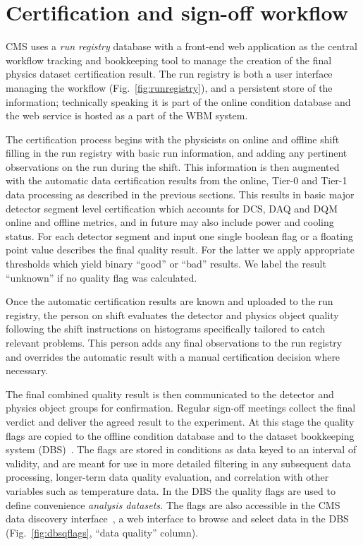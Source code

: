 \documentclass[a4paper]{jpconf}
\begin{document}
\section{Certification and sign-off workflow}\label{certification}

CMS uses a {\em run registry} database with a front-end web application as the
central workflow tracking and bookkeeping tool to manage the creation of the
final physics dataset certification result.  The run registry is both a user
interface managing the workflow (Fig.~\ref{fig:runregistry}), and a persistent
store of the information; technically speaking it is part of the online
condition database and the web service is hosted as a part of the WBM system.

The certification process begins with the physicists on online and offline
shift filling in the run registry with basic run information, and adding any
pertinent observations on the run during the shift.  This information is then
augmented with the automatic data certification results from the online,
Tier-0 and Tier-1 data processing as described in the previous sections.  This
results in basic major detector segment level certification which accounts for
DCS, DAQ and DQM online and offline metrics, and in future may also include
power and cooling status.  For each detector segment and input one single
boolean flag or a floating point value describes the final quality result.
For the latter we apply appropriate thresholds which yield binary ``good'' or
``bad'' results.  We label the result ``unknown'' if no quality flag was
calculated.

Once the automatic certification results are known and uploaded to the run
registry, the person on shift evaluates the detector and physics object
quality following the shift instructions on histograms specifically tailored
to catch relevant problems.  This person adds any final observations to the
run registry and overrides the automatic result with a manual certification
decision where necessary.

The final combined quality result is then communicated to the detector and
physics object groups for confirmation.  Regular sign-off meetings collect the
final verdict and deliver the agreed result to the experiment.  At this stage
the quality flags are copied to the offline condition database and to the
dataset bookkeeping system (DBS)~\cite{cms_dbs_07}.  The flags are stored in
conditions as data keyed to an interval of validity, and are meant for use in
more detailed filtering in any subsequent data processing, longer-term data
quality evaluation, and correlation with other variables such as temperature
data.  In the DBS the quality flags are used to define convenience {\em
  analysis datasets.}  The flags are also accessible in the CMS data discovery
interface~\cite{cms_dbs_discovery_07}, a web interface to browse and select
data in the DBS (Fig.~\ref{fig:dbsqflags}, ``data quality'' column).
\end{document}
